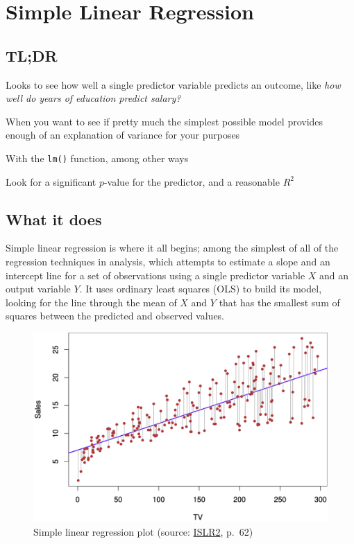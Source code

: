 \documentclass[
]{book}
\providecommand{\tightlist}{%
  \setlength{\itemsep}{0pt}\setlength{\parskip}{0pt}}
\begin{document}
\hypertarget{simple-linear-regression}{%
\chapter{Simple Linear Regression}\label{simple-linear-regression}}

\hypertarget{tldr}{%
\section{TL;DR}\label{tldr}}

\begin{description}
\tightlist
\item[What it does]
Looks to see how well a single predictor variable predicts an outcome, like \emph{how well do years of education predict salary?}
\item[When to do it]
When you want to see if pretty much the simplest possible model provides enough of an explanation of variance for your purposes
\item[How to do it]
With the \texttt{lm()} function, among other ways
\item[How to assess it]
Look for a significant \(p\)-value for the predictor, and a reasonable \(R^2\)
\end{description}

\hypertarget{what-it-does}{%
\section{What it does}\label{what-it-does}}

Simple linear regression is where it all begins; among the simplest of all of the regression techniques in analysis, which attempts to estimate a slope and an intercept line for a set of observations using a single predictor variable \(X\) and an output variable \(Y\). It uses ordinary least squares (OLS) to build its model, looking for the line through the mean of \(X\) and \(Y\) that has the smallest sum of squares between the predicted and observed values.



\begin{figure}
\includegraphics[width=16.03in]{images/3_1} \caption{Simple linear regression plot (source: \href{https://www.statlearning.com/}{ISLR2}, p.~62)}\label{fig:img-slr1}
\end{figure}
\end{document}
